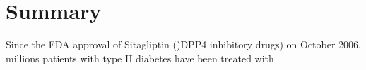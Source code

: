 \section{\label{chap:Sum} Summary}
Since the FDA approval of Sitagliptin ()DPP4 inhibitory drugs) on October 2006, millions patients with type II diabetes have been treated with 
